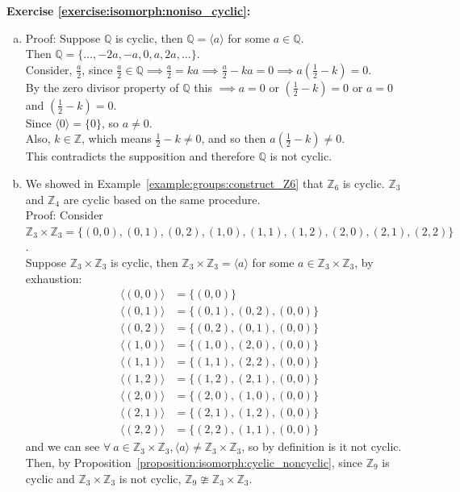 \noindent\textbf{Exercise \ref{exercise:isomorph:noniso_cyclic}:}
\begin{enumerate}[(a)]
\item
Proof: Suppose ${\mathbb Q}$ is cyclic, then ${\mathbb Q} = \langle a \rangle$ for some $a \in {\mathbb Q}$.
\\
Then ${\mathbb Q} = \{ \dotsc , -2a, -a, 0, a, 2a, \dotsc\}$.
\\
Consider, $\frac{a}{2}$, since $\frac{a}{2} \in {\mathbb Q} \implies \frac{a}{2} = ka \implies \frac{a}{2} - ka = 0 \implies a(\frac{1}{2} - k) = 0$.
\\
By the zero divisor property of ${\mathbb Q}$ this $\implies a = 0$ or $(\frac{1}{2} - k) = 0$ or $a = 0$ and $(\frac{1}{2} - k) = 0$.
\\
Since $\langle 0 \rangle = \{0\}$, so $a \neq 0$.
\\
Also, $k \in {\mathbb Z}$, which means $\frac{1}{2} - k \neq 0$, and so then $a(\frac{1}{2} - k) \neq 0$.
\\
This contradicts the supposition and therefore ${\mathbb Q}$ is not cyclic.

\item
We showed in Example~\ref{example:groups:construct_Z6} that ${\mathbb Z}_6$ is cyclic.  ${\mathbb Z}_3$ and ${\mathbb Z}_4$ are cyclic based on the same procedure.
\\
Proof: Consider ${\mathbb Z}_3 \times {\mathbb Z}_3 = \{(0, 0), (0, 1), (0, 2), (1, 0), (1, 1), (1, 2), (2, 0), (2, 1), (2,2)\}$.
\\
Suppose  ${\mathbb Z}_3 \times {\mathbb Z}_3$ is cyclic, then ${\mathbb Z}_3 \times {\mathbb Z}_3 = \langle a \rangle$ for some $a \in {\mathbb Z}_3 \times {\mathbb Z}_3$, by exhaustion:
\begin{align*}
\langle(0, 0)\rangle &= \{(0, 0)\}
\\
\langle(0, 1)\rangle &= \{(0, 1), (0, 2), (0, 0)\}
\\
\langle(0, 2)\rangle &= \{(0, 2), (0, 1), (0, 0)\}
\\
\langle(1, 0)\rangle &= \{(1, 0), (2, 0), (0, 0)\}
\\
\langle(1, 1)\rangle &= \{(1, 1), (2,2), (0, 0)\}
\\
\langle(1, 2)\rangle &= \{(1, 2), (2, 1), (0, 0)\}
\\
\langle(2, 0)\rangle &= \{(2, 0), (1, 0), (0, 0)\}
\\
\langle(2, 1)\rangle &= \{(2, 1), (1, 2), (0, 0)\}
\\
\langle(2, 2)\rangle &= \{(2, 2), (1, 1), (0, 0)\}
\end{align*}
and we can see $\forall\ a \in {\mathbb Z}_3 \times {\mathbb Z}_3, \langle a \rangle \neq {\mathbb Z}_3 \times {\mathbb Z}_3$, so by definition is it not cyclic.
\\
Then, by Proposition~\ref{proposition:isomorph:cyclic_noncyclic}, since ${\mathbb Z}_9$ is cyclic and ${\mathbb Z}_3 \times {\mathbb Z}_3$ is not cyclic, ${\mathbb Z}_9 \ncong {\mathbb Z}_3 \times {\mathbb Z}_3$.


\end{enumerate}
